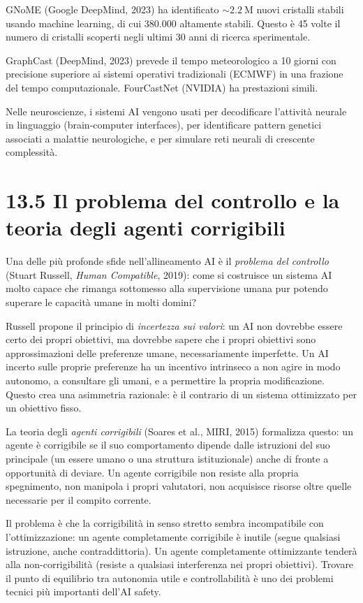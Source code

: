 \documentclass[11.5pt,a4paper,openany]{book}
\theoremstyle{remark}
\begin{document}
GNoME (Google DeepMind, 2023) ha identificato $\sim 2.2\ \text{M}$ nuovi cristalli stabili usando machine learning, di cui 380.000 altamente stabili. Questo è 45 volte il numero di cristalli scoperti negli ultimi 30 anni di ricerca sperimentale.

GraphCast (DeepMind, 2023) prevede il tempo meteorologico a 10 giorni con precisione superiore ai sistemi operativi tradizionali (ECMWF) in una frazione del tempo computazionale. FourCastNet (NVIDIA) ha prestazioni simili.

Nelle neuroscienze, i sistemi AI vengono usati per decodificare l'attività neurale in linguaggio (brain-computer interfaces), per identificare pattern genetici associati a malattie neurologiche, e per simulare reti neurali di crescente complessità.

\section{13.5 Il problema del controllo e la teoria degli agenti corrigibili}

Una delle più profonde sfide nell'allineamento AI è il \textit{problema del controllo} (Stuart Russell, \textit{Human Compatible}, 2019): come si costruisce un sistema AI molto capace che rimanga sottomesso alla supervisione umana pur potendo superare le capacità umane in molti domini?

Russell propone il principio di \textit{incertezza sui valori}: un AI non dovrebbe essere certo dei propri obiettivi, ma dovrebbe sapere che i propri obiettivi sono approssimazioni delle preferenze umane, necessariamente imperfette. Un AI incerto sulle proprie preferenze ha un incentivo intrinseco a non agire in modo autonomo, a consultare gli umani, e a permettire la propria modificazione. Questo crea una asimmetria razionale: è il contrario di un sistema ottimizzato per un obiettivo fisso.

La teoria degli \textit{agenti corrigibili} (Soares et al., MIRI, 2015) formalizza questo: un agente è corrigibile se il suo comportamento dipende dalle istruzioni del suo principale (un essere umano o una struttura istituzionale) anche di fronte a opportunità di deviare. Un agente corrigibile non resiste alla propria spegnimento, non manipola i propri valutatori, non acquisisce risorse oltre quelle necessarie per il compito corrente.

Il problema è che la corrigibilità in senso stretto sembra incompatibile con l'ottimizzazione: un agente completamente corrigibile è inutile (segue qualsiasi istruzione, anche contraddittoria). Un agente completamente ottimizzante tenderà alla non-corrigibilità (resiste a qualsiasi interferenza nei propri obiettivi). Trovare il punto di equilibrio tra autonomia utile e controllabilità è uno dei problemi tecnici più importanti dell'AI safety.
\end{document}
